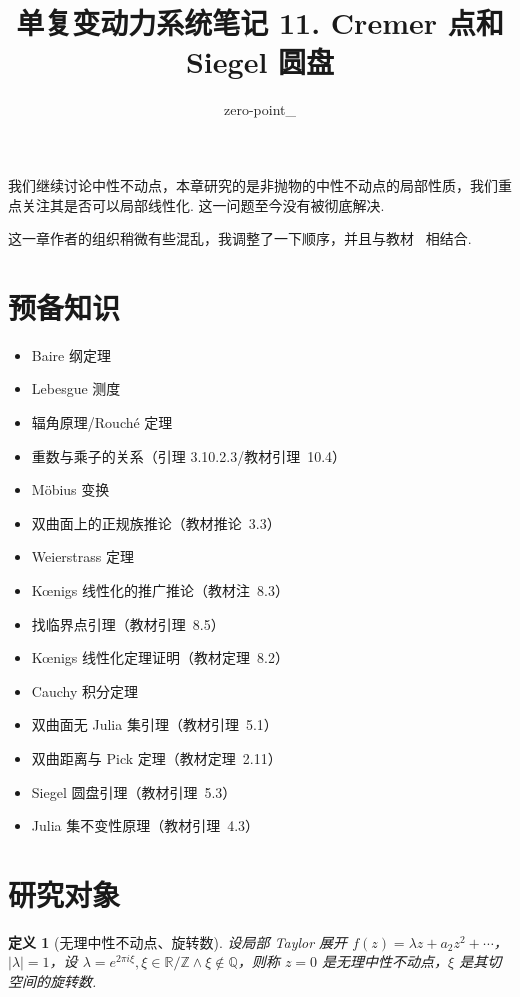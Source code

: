 \documentclass[11pt, a4paper, oneside]{ctexart}
\title{单复变动力系统笔记 11. Cremer 点和 Siegel 圆盘}
\author{zero-point\_}
\newtheorem{definition}[theorem]{定义}
\newcommand{\Q}{\mathbb{Q}}
\newcommand{\R}{\mathbb{R}}
\newcommand{\Z}{\mathbb{Z}}
\begin{document}
	\maketitle

    我们继续讨论中性不动点，本章研究的是非抛物的中性不动点的局部性质，我们重点关注其是否可以局部线性化. 这一问题至今没有被彻底解决.

    这一章作者的组织稍微有些混乱，我调整了一下顺序，并且与教材~\cite{katok} 相结合.

    \setcounter{section}{-1}
    \section{预备知识}
    \begin{itemize}
        \item Baire 纲定理
        \item Lebesgue 测度
        \item 辐角原理/Rouché 定理
        \item 重数与乘子的关系（引理 3.10.2.3/教材引理~10.4）
        \item Möbius 变换
        \item 双曲面上的正规族推论（教材推论~3.3）
        \item Weierstrass 定理
        \item Kœnigs 线性化的推广推论（教材注~8.3）
        \item 找临界点引理（教材引理~8.5）
        \item Kœnigs 线性化定理证明（教材定理~8.2）
        \item Cauchy 积分定理
        \item 双曲面无 Julia 集引理（教材引理~5.1）
        \item 双曲距离与 Pick 定理（教材定理~2.11）
        \item Siegel 圆盘引理（教材引理~5.3）
        \item Julia 集不变性原理（教材引理~4.3）
    \end{itemize}

    \section{研究对象}
    \begin{definition}[无理中性不动点、旋转数]
        设局部 Taylor 展开 $f(z)=\lambda z+a_2 z^2+\cdots$，$|\lambda|=1$，设 $\lambda=e^{2\pi i\xi},\xi\in \R/\Z\wedge \xi\notin \Q$，则称 $z=0$ 是无理中性不动点，$\xi$ 是其切空间的旋转数.
    \end{definition}
\end{document}
